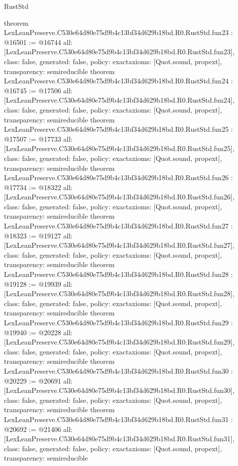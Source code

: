 \begin{lexlean}{RustStd}
\begin{coremodule}
{}
theorem LexLeanPreserve.C530e64d80e75d9b4c13bf34d629b18bd.R0.RustStd.fun23 : @16501 := @16744 {
  all: [LexLeanPreserve.C530e64d80e75d9b4c13bf34d629b18bd.R0.RustStd.fun23],
  class: false,
  generated: false,
  policy: exact{axioms: [Quot.sound, propext]},
  transparency: semireducible
}
theorem LexLeanPreserve.C530e64d80e75d9b4c13bf34d629b18bd.R0.RustStd.fun24 : @16745 := @17506 {
  all: [LexLeanPreserve.C530e64d80e75d9b4c13bf34d629b18bd.R0.RustStd.fun24],
  class: false,
  generated: false,
  policy: exact{axioms: [Quot.sound, propext]},
  transparency: semireducible
}
theorem LexLeanPreserve.C530e64d80e75d9b4c13bf34d629b18bd.R0.RustStd.fun25 : @17507 := @17733 {
  all: [LexLeanPreserve.C530e64d80e75d9b4c13bf34d629b18bd.R0.RustStd.fun25],
  class: false,
  generated: false,
  policy: exact{axioms: [Quot.sound, propext]},
  transparency: semireducible
}
theorem LexLeanPreserve.C530e64d80e75d9b4c13bf34d629b18bd.R0.RustStd.fun26 : @17734 := @18322 {
  all: [LexLeanPreserve.C530e64d80e75d9b4c13bf34d629b18bd.R0.RustStd.fun26],
  class: false,
  generated: false,
  policy: exact{axioms: [Quot.sound, propext]},
  transparency: semireducible
}
theorem LexLeanPreserve.C530e64d80e75d9b4c13bf34d629b18bd.R0.RustStd.fun27 : @18323 := @19127 {
  all: [LexLeanPreserve.C530e64d80e75d9b4c13bf34d629b18bd.R0.RustStd.fun27],
  class: false,
  generated: false,
  policy: exact{axioms: [Quot.sound, propext]},
  transparency: semireducible
}
theorem LexLeanPreserve.C530e64d80e75d9b4c13bf34d629b18bd.R0.RustStd.fun28 : @19128 := @19939 {
  all: [LexLeanPreserve.C530e64d80e75d9b4c13bf34d629b18bd.R0.RustStd.fun28],
  class: false,
  generated: false,
  policy: exact{axioms: [Quot.sound, propext]},
  transparency: semireducible
}
theorem LexLeanPreserve.C530e64d80e75d9b4c13bf34d629b18bd.R0.RustStd.fun29 : @19940 := @20228 {
  all: [LexLeanPreserve.C530e64d80e75d9b4c13bf34d629b18bd.R0.RustStd.fun29],
  class: false,
  generated: false,
  policy: exact{axioms: [Quot.sound, propext]},
  transparency: semireducible
}
theorem LexLeanPreserve.C530e64d80e75d9b4c13bf34d629b18bd.R0.RustStd.fun30 : @20229 := @20691 {
  all: [LexLeanPreserve.C530e64d80e75d9b4c13bf34d629b18bd.R0.RustStd.fun30],
  class: false,
  generated: false,
  policy: exact{axioms: [Quot.sound, propext]},
  transparency: semireducible
}
theorem LexLeanPreserve.C530e64d80e75d9b4c13bf34d629b18bd.R0.RustStd.fun31 : @20692 := @21406 {
  all: [LexLeanPreserve.C530e64d80e75d9b4c13bf34d629b18bd.R0.RustStd.fun31],
  class: false,
  generated: false,
  policy: exact{axioms: [Quot.sound, propext]},
  transparency: semireducible
}
\end{coremodule}
\end{lexlean}
